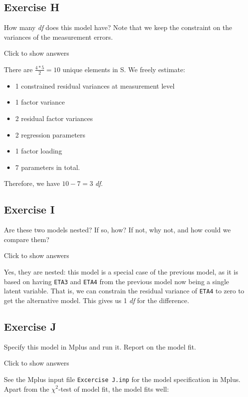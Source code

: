 \documentclass[
]{book}
\providecommand{\tightlist}{%
  \setlength{\itemsep}{0pt}\setlength{\parskip}{0pt}}
\begin{document}
\hypertarget{exercise-h}{%
\subsection{Exercise H}\label{exercise-h}}

How many \emph{df} does this model have? Note that we keep the constraint on the variances of the measurement errors.

Click to show answers

There are \(\frac{4*5}{2} = 10\) unique elements in S. We freely estimate:

\begin{itemize}
\tightlist
\item
  1 constrained residual variances at measurement level
\item
  1 factor variance
\item
  2 residual factor variances
\item
  2 regression parameters
\item
  1 factor loading
\item
  7 parameters in total.
\end{itemize}

Therefore, we have \(10 - 7 = 3\) \emph{df}.

\hypertarget{exercise-i}{%
\subsection{Exercise I}\label{exercise-i}}

Are these two models nested? If so, how? If not, why not, and how could we compare them?

Click to show answers

Yes, they are nested: this model is a special case of the previous model, as it is based on having \texttt{ETA3} and \texttt{ETA4} from the previous model now being a single latent variable. That is, we can constrain the residual variance of \texttt{ETA4} to zero to get the alternative model. This gives us 1 \emph{df} for the difference.

\hypertarget{exercise-j}{%
\subsection{Exercise J}\label{exercise-j}}

Specify this model in Mplus and run it. Report on the model fit.

Click to show answers

See the Mplus input file \texttt{Excercise\ J.inp} for the model specification in Mplus. Apart from the \(\chi^{2}\)-test of model fit, the model fits well:
\end{document}
